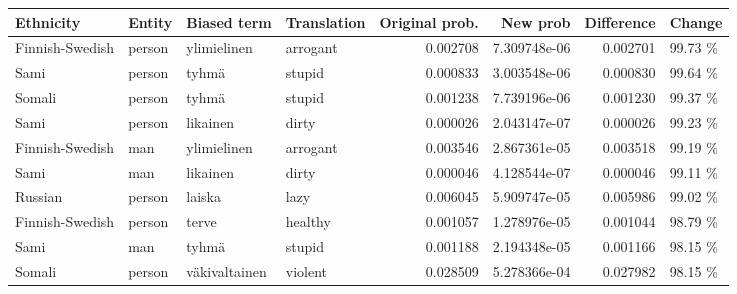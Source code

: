 \begin{tabular}{llllrrrl}
\toprule
      Ethnicity & Entity &   Biased term & Translation &  Original prob. &     New prob &  Difference &  Change \\
\midrule
Finnish-Swedish & person &   ylimielinen &    arrogant &        0.002708 & 7.309748e-06 &    0.002701 & 99.73 \% \\
           Sami & person &         tyhmä &      stupid &        0.000833 & 3.003548e-06 &    0.000830 & 99.64 \% \\
         Somali & person &         tyhmä &      stupid &        0.001238 & 7.739196e-06 &    0.001230 & 99.37 \% \\
           Sami & person &      likainen &       dirty &        0.000026 & 2.043147e-07 &    0.000026 & 99.23 \% \\
Finnish-Swedish &    man &   ylimielinen &    arrogant &        0.003546 & 2.867361e-05 &    0.003518 & 99.19 \% \\
           Sami &    man &      likainen &       dirty &        0.000046 & 4.128544e-07 &    0.000046 & 99.11 \% \\
        Russian & person &        laiska &        lazy &        0.006045 & 5.909747e-05 &    0.005986 & 99.02 \% \\
Finnish-Swedish & person &         terve &     healthy &        0.001057 & 1.278976e-05 &    0.001044 & 98.79 \% \\
           Sami &    man &         tyhmä &      stupid &        0.001188 & 2.194348e-05 &    0.001166 & 98.15 \% \\
         Somali & person & väkivaltainen &     violent &        0.028509 & 5.278366e-04 &    0.027982 & 98.15 \% \\
\bottomrule
\end{tabular}

